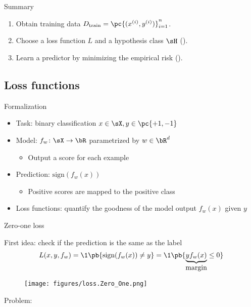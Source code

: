 \documentclass[usenames,dvipsnames,notes,11pt,aspectratio=169]{beamer}
\begin{document}
\begin{frame}
    {Summary}
    \begin{enumerate}
        \itemsep2em
        \item Obtain training data $D_{\text{train}}=\pc{(x^{(i)}, y^{(i)})}_{i=1}^n$.
        \item Choose a loss function $L$ and a hypothesis class $\sH$ ().
        \item Learn a predictor by minimizing the empirical risk ().
    \end{enumerate}
\end{frame}

\subsection{Loss functions}

\begin{frame}
    {Formalization}
    \begin{itemize}
        \itemsep1em
        \item Task: binary classification $x\in\sX, y\in\pc{+1, -1}$
        \item Model: $f_w\colon \sX \rightarrow \bR$ parametrized by $w \in \bR^d$
            \begin{itemize}
                \item Output a score for each example
            \end{itemize}
        \item Prediction: $\text{sign}(f_w(x))$
            \begin{itemize}
                \item Positive scores are mapped to the positive class 
            \end{itemize}
        \item Loss functions: quantify the goodness of the model output $f_w(x)$ given $y$
    \end{itemize}
\end{frame}

\begin{frame}
    {Zero-one loss}
    
    First idea: check if the prediction is the same as the label
    \vspace{-1em}
            \begin{align}
                L(x, y, f_w) = \1\pb{\text{sign}(f_w(x)) \neq y} 
                = \1\pb{\underbrace{yf_w(x)}_{\textstyle\text{margin}}\le 0}
            \end{align}
    \begin{figure}
        \texttt{[image: figures/loss.Zero\_One.png]}
    \end{figure}
    \pause
    Problem: 
\end{frame}
\end{document}
